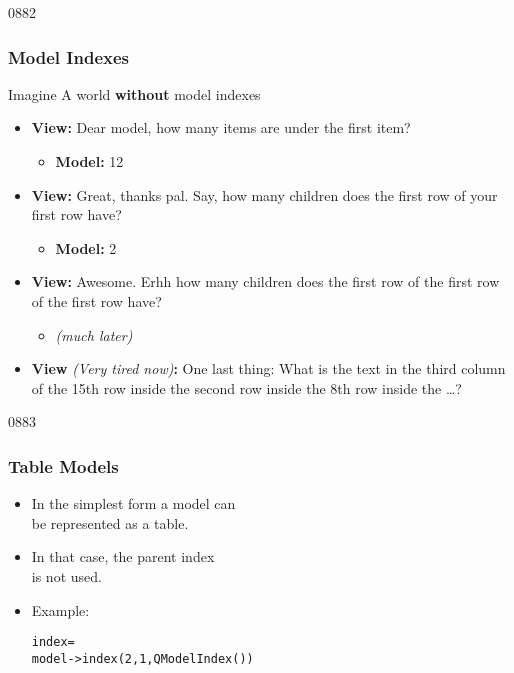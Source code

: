 \begin{slide}{0882}\frametitle{Model Indexes}
\begin{block}{Imagine}
A world \textbf{without} model indexes
\end{block}

\begin{itemize}
\item \textbf{View:} Dear model, how many items are under the first item?
  \begin{itemize}
  \item \textbf{Model:} 12
  \end{itemize}
\item \textbf{View:} Great, thanks pal. Say, how many children does
  the first row of your first row have?
  \begin{itemize}
  \item \textbf{Model:} 2
  \end{itemize}
\item \textbf{View:} Awesome. Erhh how many children does the first row of the
  first row of the first row have?
  \begin{itemize}
  \item \textit{(much later)}
  \end{itemize}
  \item \textbf{View} \textit{(Very tired now)}\textbf{:} One last thing: What is
the text in the third column of the 15th row inside the second row inside
the 8th row inside the \ldots?
\end{itemize}
\end{slide}

\begin{slide}[fragile]{0883}
\frametitle{Table Models}
\begin{itemize}
\item In the simplest form a model can\\
  be represented as a table.
\item In that case, the parent index\\
  is not used.
\item Example:
\begin{alltt}
 index = 
model->index(2,1, QModelIndex())
\end{alltt}
\end{itemize}
\end{slide}

